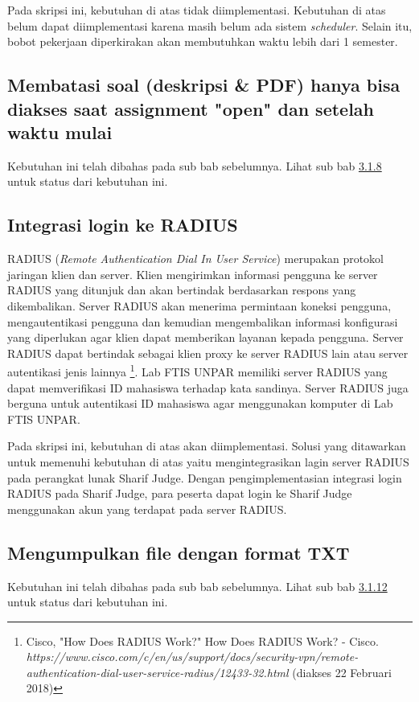 Pada skripsi ini, kebutuhan di atas tidak diimplementasi. Kebutuhan di atas belum dapat diimplementasi karena masih belum ada sistem \textit{scheduler}. Selain itu, bobot pekerjaan diperkirakan akan membutuhkan waktu lebih dari 1 semester.

\subsection{Membatasi soal (deskripsi \& PDF) hanya bisa diakses saat assignment "open" dan setelah waktu mulai}
Kebutuhan ini telah dibahas pada sub bab sebelumnya. Lihat sub bab \hyperref[subsec:membatasisoal]{3.1.8} untuk status dari kebutuhan ini.

\subsection{Integrasi login ke RADIUS}
RADIUS (\textit{Remote Authentication Dial In User Service}) merupakan protokol jaringan klien dan server. Klien mengirimkan informasi pengguna ke server RADIUS yang ditunjuk dan akan bertindak berdasarkan respons yang dikembalikan. Server RADIUS akan menerima permintaan koneksi pengguna, mengautentikasi pengguna dan kemudian mengembalikan informasi konfigurasi yang diperlukan agar klien dapat memberikan layanan kepada pengguna. Server RADIUS dapat bertindak sebagai klien proxy ke server RADIUS lain atau server autentikasi jenis lainnya \footnote{Cisco, "How Does RADIUS Work?" How Does RADIUS Work? - Cisco. \textit{https://www.cisco.com/c/en/us/support/docs/security-vpn/remote-authentication-dial-user-service-radius/12433-32.html} (diakses 22 Februari 2018)}. %
Lab FTIS UNPAR memiliki server RADIUS yang dapat memverifikasi ID mahasiswa terhadap kata sandinya. Server RADIUS juga berguna untuk autentikasi ID mahasiswa agar menggunakan komputer di Lab FTIS UNPAR.

Pada skripsi ini, kebutuhan di atas akan diimplementasi. Solusi yang ditawarkan untuk memenuhi kebutuhan di atas yaitu mengintegrasikan lagin server RADIUS pada perangkat lunak Sharif Judge. Dengan pengimplementasian integrasi login RADIUS pada Sharif Judge, para peserta dapat login ke Sharif Judge menggunakan akun yang terdapat pada server RADIUS. 

\subsection{Mengumpulkan file dengan format TXT}
Kebutuhan ini telah dibahas pada sub bab sebelumnya. Lihat sub bab \hyperref[subsec:filetxt]{3.1.12} untuk status dari kebutuhan ini.

